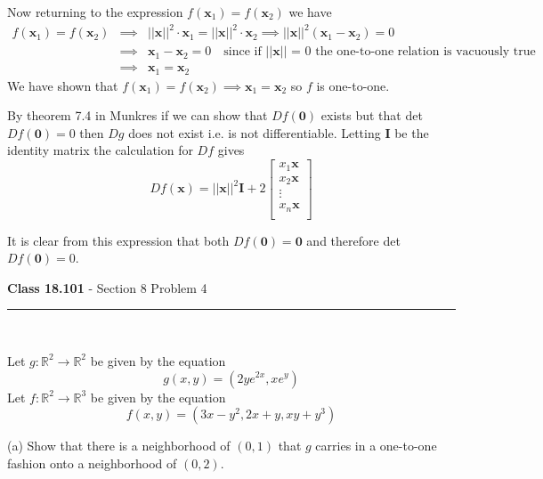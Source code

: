 \documentclass[11pt,reqno]{article}
\begin{document}
\noindent Now returning to the expression $f(\textbf{x}_1) = f(\textbf{x}_2)$ we have 
\begin{eqnarray*} 
f(\textbf{x}_1) = f(\textbf{x}_2) &\implies& ||\textbf{x}||^2\cdot \textbf{x}_1 = ||\textbf{x}||^2\cdot \textbf{x}_2 \implies ||\textbf{x}||^2 (\textbf{x}_1-  \textbf{x}_2) = 0 \\
&\implies& \textbf{x}_1 -  \textbf{x}_2 = 0 \quad \text{since if $||\textbf{x}||$ = 0 the one-to-one relation is vacuously true}\\
&\implies& \textbf{x}_1 = \textbf{x}_2
\end{eqnarray*}
We have shown that $f(\textbf{x}_1) = f(\textbf{x}_2) \implies \textbf{x}_1 = \textbf{x}_2$ so $f$ is one-to-one.


By theorem 7.4 in Munkres if we can show that $D f(\textbf{0})$ exists but that det$D f(\textbf{0}) = 0$ then $D g$ does not exist i.e. is not differentiable. 
Letting $\textbf{I}$ be the identity matrix the calculation for $D f$ gives
\[ D f(\textbf{x}) = ||\textbf{x}||^2 \textbf{I} + 2 \left[ \begin{array}{c}
x_1 \textbf{x} \\
x_2 \textbf{x} \\
\vdots \\
x_n \textbf{x} \\
\end{array} \right] \]
 
It is clear from this expression that both $D f(\textbf{0}) = \textbf{0}$ and therefore det $D f(\textbf{0}) = 0$.
 
\begin{flushleft} 
\textbf{Class 18.101} - Section 8 Problem 4\\
\rule{500pt}{1pt}\\
\end{flushleft} 

\noindent Let $g : \mathbb{R}^2 \to \mathbb{R}^2$ be given by the equation
\[ g(x,y) = (2 y e^{2x}, x e^y) \]
Let $f : \mathbb{R}^2 \to \mathbb{R}^3$ be given by the equation
\[ f(x,y) = (3x - y^2,2x + y,xy + y^3) \]

\noindent (a) Show that there is a neighborhood of $(0,1)$ that $g$ carries in a one-to-one fashion onto a neighborhood of $(0,2)$.\\
\end{document}
